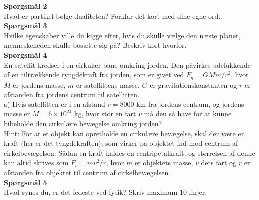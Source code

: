 \documentclass[a4paper,oneside,article]{memoir}
\begin{document}
\textbf{Spørgsmål 2}\\
Hvad er partikel-bølge dualiteten? Forklar det kort med dine egne ord.\\


\textbf{Spørgsmål 3}\\
Hvilke egenskaber ville du kigge efter, hvis du skulle vælge den næste planet, menneskeheden skulle bosætte sig på? Beskriv kort hvorfor.\\

\textbf{Spørgsmål 4}\\
En satellit kredser i en cirkulær bane omkring jorden. Den påvirkes udelukkende af en tiltrækkende tyngdekraft fra jorden, som er givet ved $F_g = GMm/r^2$, hvor $M$ er jordens masse, $m$ er satellittens masse, $G$ er gravitationskonstanten og $r$ er afstanden fra jordens centrum til satellitten.\\

a) Hvis satellitten er i en afstand $r = 8000$ km fra jordens centrum, og jordens masse er $M = 6 \times 10^{24}$ kg, hvor stor en fart $v$ må den så have for at kunne bibeholde den cirkulære bevægelse omkring jorden?\\

Hint: For at et objekt kan opretholde en cirkulære bevægelse, skal der være en kraft (her er det tyngdekraften), som virker på objektet ind mod centrum af cirkelbevægelsen. Sådan en kraft kaldes en centripetalkraft, og størrelsen af denne kan altid skrives som $F_c = mv^2/r$, hvor $m$ er objektets masse, $v$ dets fart og $r$ er afstanden fra objektet til centrum af cirkelbevægelsen.\\

\textbf{Spørgsmål 5}\\
Hvad synes du, er det fedeste ved fysik? Skriv maximum 10 linjer.
\end{document}

